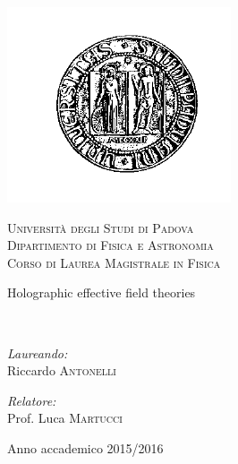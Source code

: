 \begin{titlepage}
\begin{center}
 
\includegraphics[scale=.5]{images/logoBlack}
 
\textsc{\LARGE Università degli Studi di Padova}\\[1.5cm]
 
\textsc{\Large Dipartimento di Fisica e Astronomia\\[0.2cm] Corso di Laurea Magistrale in Fisica}\\[2cm]
  

{\Huge \doublespacing \bfseries \begin{spacing}{1}{Holographic effective field theories}\end{spacing}}
~\\[4cm]
 
\begin{minipage}{0.4\textwidth}
\begin{flushleft} \large
\emph{Laureando:}\\
Riccardo \textsc{Antonelli}
\end{flushleft}
\end{minipage}
\begin{minipage}{0.4\textwidth}
\begin{flushright} \large
\emph{Relatore:} \\
Prof. Luca \textsc{Martucci}
\end{flushright}
\end{minipage}
 
\vfill
 
{\large Anno accademico 2015/2016}
 
\end{center}

\end{titlepage}

